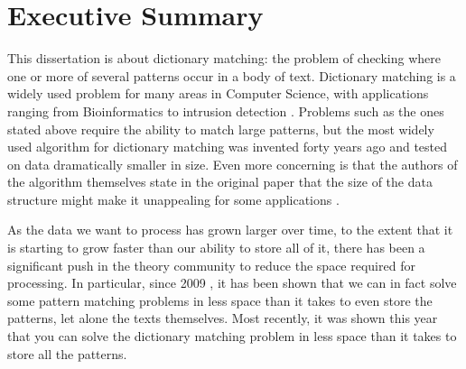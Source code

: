 \documentclass[ %
                    author={Dominic Joseph Moylett},
                    degree={MEng},
                     title={Dictionary Matching with Fingerprints},
                  subtitle={An Empirical Analysis},
                      type={research},
                      year={2015} ]{dissertation}
\begin{document}

\maketitle


\frontmatter


\makedecl


\chapter*{Executive Summary}

This dissertation is about dictionary matching: the problem of checking where one or more of several patterns occur in a body of text. Dictionary matching is a widely used problem for many areas in Computer Science, with applications ranging from Bioinformatics \cite{15713233} to intrusion detection \cite{1354682}. Problems such as the ones stated above require the ability to match large patterns, but the most widely used algorithm for dictionary matching was invented forty years ago and tested on data dramatically smaller in size. Even more concerning is that the authors of the algorithm themselves state in the original paper that the size of the data structure might make it unappealing for some applications \cite{Aho:1975:ESM:360825.360855}.

As the data we want to process has grown larger over time, to the extent that it is starting to grow faster than our ability to store all of it, there has been a significant push in the theory community to reduce the space required for processing. In particular, since 2009 \cite{5438620}, it has been shown that we can in fact solve some pattern matching problems in less space than it takes to even store the patterns, let alone the texts themselves. Most recently, it was shown this year \cite{2015arXiv150406242C} that you can solve the dictionary matching problem in less space than it takes to store all the patterns.
\end{document}
